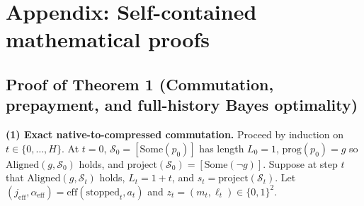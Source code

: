 \documentclass[11pt,letterpaper]{article}
\begin{document}
\appendix

\section{Appendix: Self-contained mathematical
proofs}\label{appendix-self-contained-mathematical-proofs}

\subsection{Proof of Theorem 1 (Commutation, prepayment, and
full-history Bayes
optimality)}\label{proof-of-theorem-1-commutation-prepayment-and-full-history-bayes-optimality}

\textbf{(1) Exact native-to-compressed commutation.} Proceed by
induction on \(t \in \{0, \dots, H\}\). At \(t = 0\),
\(\mathcal{S}_0 = [\mathrm{Some}(p_0)]\) has length \(L_0 = 1\),
\(\mathrm{prog}(p_0) = g\) so \(\mathrm{Aligned}(g, \mathcal{S}_0)\)
holds, and
\(\mathrm{project}(\mathcal{S}_0) = [\mathrm{Some}(\neg g)]\). Suppose
at step \(t\) that \(\mathrm{Aligned}(g, \mathcal{S}_t)\) holds,
\(L_t = 1 + t\), and \(s_t = \mathrm{project}(\mathcal{S}_t)\). Let
\((j_{\mathrm{eff}}, \alpha_{\mathrm{eff}}) = \mathrm{eff}(\mathrm{stopped}_t, a_t)\)
and \(z_t = (m_t, \ell_t) \in \{0,1\}^2\).
\end{document}
